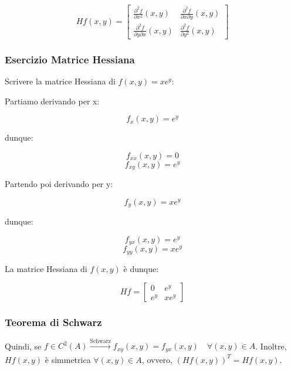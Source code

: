 \[
    Hf(x,y) = \begin{bmatrix}
        \displaystyle\frac{\partial^{2} f}{\partial x^{2}}(x,y)        & \displaystyle\frac{\partial^{2} f}{\partial x \partial y}(x,y) \\[5mm]
        \displaystyle\frac{\partial^{2} f}{\partial y \partial x}(x,y) & \displaystyle\frac{\partial^{2} f}{\partial y^{2}}(x,y)
    \end{bmatrix}
\]

\subsubsection*{Esercizio Matrice Hessiana}

Scrivere la matrice Hessiana di \(f(x,y)= xe ^{y}\):

Partiamo derivando per x:

\[
    f_x(x,y) = e ^{y}
\]

dunque:

\[
    f_{xx}(x,y) = 0
\]
\[
    f_{xy}(x,y) = e^{y}
\]

Partendo poi derivando per y:

\[
    f_y(x,y) = x e^{y}
\]

dunque:

\[
    f_{yx}(x,y) = e^{y}
\]
\[
    f_{yy}(x,y) = x e^{y}
\]

La matrice Hessiana di \(f(x,y)\) è dunque:

\[
    Hf = \begin{bmatrix}
        0      & e ^{y}  \\
        e ^{y} & x e^{y}
    \end{bmatrix}
\]

\pagebreak
\subsubsection{Teorema di Schwarz}


Quindi, se \(f \in C^{2} (A) \xrightarrow[]{\text{Schwarz}} f_{xy}(x,y) = f_{yx}(x,y) \quad \forall (x,y) \in A\). Inoltre, \(H f(x,y)\) è simmetrica \(\forall (x,y) \in A\), ovvero, \({(Hf(x,y))}^{T}=Hf(x,y)\).

